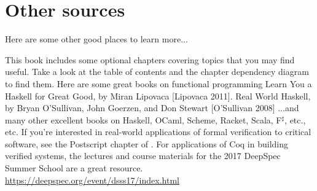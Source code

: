 \section{Other sources}

Here are some other good places to learn more...

\begin{outline}
\1 This book includes some optional chapters covering topics that you may
  find useful. Take a look at the table of contents and the chapter dependency
  diagram to find them.
\1 
\1 Here are some great books on functional programming
  \2 Learn You a Haskell for Great Good, by Miran Lipovaca [Lipovaca
    2011].
  \2 Real World Haskell, by Bryan O'Sullivan, John Goerzen, and Don
  Stewart [O'Sullivan 2008]
  \2 ...and many other excellent books on Haskell, OCaml, Scheme, Racket,
  Scala, F$^\sharp$, etc., etc.
\1 If you're interested in real-world applications of formal verification to
  critical software, see the Postscript chapter of .
\1 For applications of Coq in building verified systems, the lectures and
  course materials for the 2017 DeepSpec Summer School are a great
  resource. \url{https://deepspec.org/event/dsss17/index.html}
\end{outline}

\printglossaries

\printbibliography
